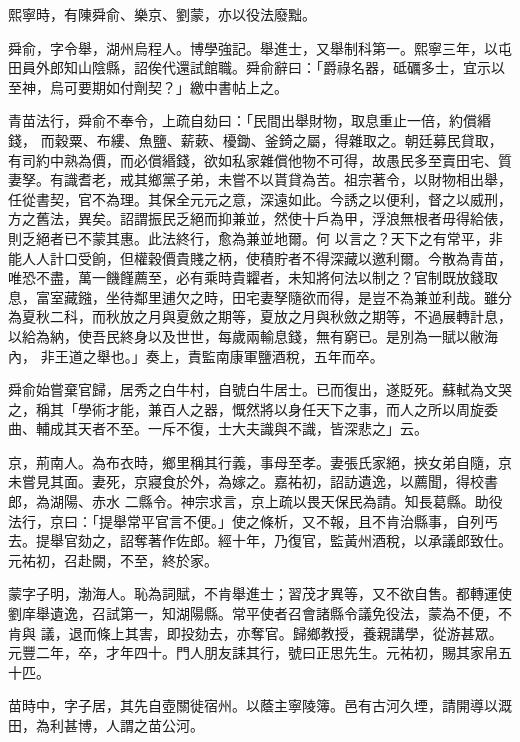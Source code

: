 \begin{pinyinscope}
 熙寧時，有陳舜俞、樂京、劉蒙，亦以役法廢黜。



 舜俞，字令舉，湖州烏程人。博學強記。舉進士，又舉制科第一。熙寧三年，以屯田員外郎知山陰縣，詔俟代還試館職。舜俞辭曰：「爵祿名器，砥礪多士，宜示以至神，烏可要期如付劑契？」繳中書帖上之。



 青苗法行，舜俞不奉令，上疏自劾曰：「民間出舉財物，取息重止一倍，約償緡錢，
 而穀粟、布縷、魚鹽、薪蔌、櫌鋤、釜錡之屬，得雜取之。朝廷募民貸取，有司約中熟為價，而必償緡錢，欲如私家雜償他物不可得，故愚民多至賣田宅、質妻孥。有識耆老，戒其鄉黨子弟，未嘗不以貰貸為苦。祖宗著令，以財物相出舉，任從書契，官不為理。其保全元元之意，深遠如此。今誘之以便利，督之以威刑，方之舊法，異矣。詔謂振民乏絕而抑兼並，然使十戶為甲，浮浪無根者毋得給俵，則乏絕者已不蒙其惠。此法終行，愈為兼並地爾。何
 以言之？天下之有常平，非能人人計口受餉，但權穀價貴賤之柄，使積貯者不得深藏以邀利爾。今散為青苗，唯恐不盡，萬一饑饉薦至，必有乘時貴糶者，未知將何法以制之？官制既放錢取息，富室藏鏹，坐待鄰里逋欠之時，田宅妻孥隨欲而得，是豈不為兼並利哉。雖分為夏秋二科，而秋放之月與夏斂之期等，夏放之月與秋斂之期等，不過展轉計息，以給為納，使吾民終身以及世世，每歲兩輸息錢，無有窮已。是別為一賦以敝海內，
 非王道之舉也。」奏上，責監南康軍鹽酒稅，五年而卒。



 舜俞始嘗棄官歸，居秀之白牛村，自號白牛居士。已而復出，遂貶死。蘇軾為文哭之，稱其「學術才能，兼百人之器，慨然將以身任天下之事，而人之所以周旋委曲、輔成其天者不至。一斥不復，士大夫識與不識，皆深悲之」云。



 京，荊南人。為布衣時，鄉里稱其行義，事母至孝。妻張氏家絕，挾女弟自隨，京未嘗見其面。妻死，京寢食於外，為嫁之。嘉祐初，詔訪遺逸，以薦聞，得校書郎，為湖陽、赤水
 二縣令。神宗求言，京上疏以畏天保民為請。知長葛縣。助役法行，京曰：「提舉常平官言不便。」使之條析，又不報，且不肯治縣事，自列丐去。提舉官劾之，詔奪著作佐郎。經十年，乃復官，監黃州酒稅，以承議郎致仕。元祐初，召赴闕，不至，終於家。



 蒙字子明，渤海人。恥為詞賦，不肯舉進士；習茂才異等，又不欲自售。都轉運使劉庠舉遺逸，召試第一，知湖陽縣。常平使者召會諸縣令議免役法，蒙為不便，不肯與
 議，退而條上其害，即投劾去，亦奪官。歸鄉教授，養親講學，從游甚眾。元豐二年，卒，才年四十。門人朋友誄其行，號曰正思先生。元祐初，賜其家帛五十匹。



 苗時中，字子居，其先自壺關徙宿州。以蔭主寧陵簿。邑有古河久堙，請開導以溉田，為利甚博，人謂之苗公河。




\end{pinyinscope}
